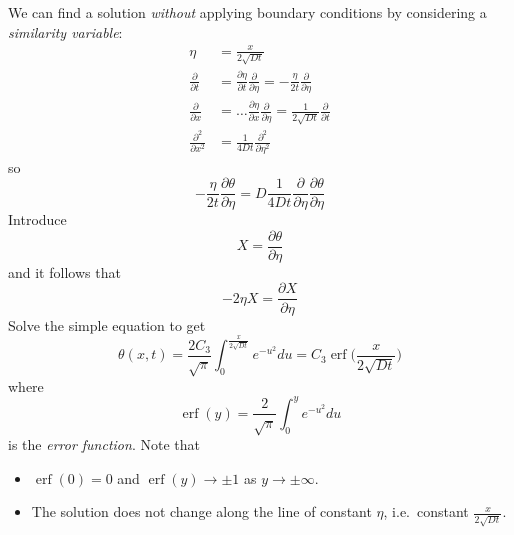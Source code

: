 \documentclass[a4paper]{article}
\DeclareMathOperator{\erf}{erf}
\begin{document}
We can find a solution \emph{without} applying boundary conditions by considering a \emph{similarity variable}:
\begin{align*}
  \eta &= \frac{x}{2\sqrt{Dt}} \\
  \frac{\partial  }{\partial t} &= \frac{\partial \eta}{\partial t} \frac{\partial  }{\partial \eta} = -\frac{\eta}{2t} \frac{\partial  }{\partial \eta} \\
  \frac{\partial  }{\partial x} &= \dots\frac{\partial \eta}{\partial x} \frac{\partial  }{\partial \eta} = \frac{1}{2\sqrt{Dt}} \frac{\partial  }{\partial t} \\
  \frac{\partial^2  }{\partial x^2} &= \frac{1}{4Dt} \frac{\partial^2  }{\partial \eta^2}
\end{align*}
so
\[
  -\frac{\eta}{2t} \frac{\partial \theta}{\partial \eta} = D \frac{1}{4Dt} \frac{\partial  }{\partial \eta} \frac{\partial \theta}{\partial \eta}
\]
Introduce
\[
  X = \frac{\partial \theta}{\partial \eta}
\]
and it follows that
\[
  -2\eta X = \frac{\partial X}{\partial \eta}
\]
Solve the simple equation to get
\[
  \theta(x,t) = \frac{2C_3}{\sqrt \pi} \int_{0}^{\frac{x}{2\sqrt{Dt}}} e^{-u^2} du  = C_3 \erf \Big( \frac{x}{2\sqrt{Dt}} \Big)
\]
where
\[
  \erf(y) = \frac{2}{\sqrt \pi} \int_{0}^{y} e^{-u^2} du
\]
is the \emph{error function}. Note that
\begin{itemize}
\item \(\erf(0) = 0\) and \(\erf(y) \to \pm 1\) as \(y \to \pm \infty\).
\item The solution does not change along the line of constant \(\eta\), i.e.\ constant \(\frac{x}{2\sqrt{Dt}}\).
\end{itemize}
\end{document}
